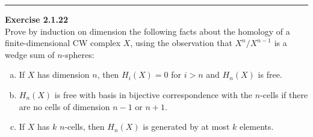 \documentclass[a4paper, 12pt]{article}
\newenvironment{problem}[2][Exercise]
    { \begin{mdframed}[backgroundcolor=gray!20] \textbf{#1 #2} \\}
    {  \end{mdframed}}
\begin{document}
\noindent\rule{7in}{2.8pt}
\begin{problem}{2.1.22}
Prove by induction on dimension the following facts about the homology of a finite-dimensional CW complex \(X\), using the observation that \(X^n/X^{n-1}\) is a wedge sum of \(n\)-spheres:
\begin{enumerate}[(a)]
	\item If \(X\) has dimension \(n\), then \(H_i(X)=0\) for \(i>n\) and \(H_n(X)\) is free. 
	\item \(H_n(X)\) is free with basis in bijective correspondence with the \(n\)-cells if there are no cells of dimension \(n-1\) or \(n+1\).
	\item If \(X\) has \(k\) \(n\)-cells, then \(H_n(X)\) is generated by at most \(k\) elements.
\end{enumerate}
\end{problem}
\end{document}
